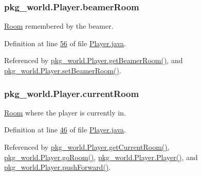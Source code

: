 \hypertarget{classpkg__world_1_1Player_aadfcdea19eefea1137932f9329c08209}{
\subsubsection[{beamer\-Room}]{ pkg\-\_\-world.\-Player.\-beamer\-Room\hspace{0.3cm}{\ttfamily [private]}}}\label{classpkg__world_1_1Player_aadfcdea19eefea1137932f9329c08209}


\hyperlink{classpkg__world_1_1Room}{Room} remembered by the beamer. 



Definition at line \hyperlink{Player_8java_source_l00056}{56} of file \hyperlink{Player_8java_source}{Player.\-java}.



Referenced by \hyperlink{Player_8java_source_l00161}{pkg\-\_\-world.\-Player.\-get\-Beamer\-Room()}, and \hyperlink{Player_8java_source_l00153}{pkg\-\_\-world.\-Player.\-set\-Beamer\-Room()}.

\hypertarget{classpkg__world_1_1Player_a2b0217339fe7077674b0e0a1ad33cc1e}{
\subsubsection[{current\-Room}]{ pkg\-\_\-world.\-Player.\-current\-Room\hspace{0.3cm}{\ttfamily [private]}}}\label{classpkg__world_1_1Player_a2b0217339fe7077674b0e0a1ad33cc1e}


\hyperlink{classpkg__world_1_1Room}{Room} where the player is currently in. 



Definition at line \hyperlink{Player_8java_source_l00046}{46} of file \hyperlink{Player_8java_source}{Player.\-java}.



Referenced by \hyperlink{Player_8java_source_l00099}{pkg\-\_\-world.\-Player.\-get\-Current\-Room()}, \hyperlink{Player_8java_source_l00107}{pkg\-\_\-world.\-Player.\-go\-Room()}, \hyperlink{Player_8java_source_l00063}{pkg\-\_\-world.\-Player.\-Player()}, and \hyperlink{Player_8java_source_l00130}{pkg\-\_\-world.\-Player.\-push\-Forward()}.

